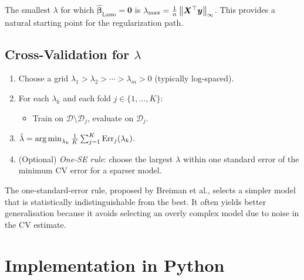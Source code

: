 \begin{proposition}
The smallest $\lambda$ for which $\hat{\bm{\beta}}_{\text{Lasso}} = \bm{0}$ is $\lambda_{\max} = \frac{1}{n}\left\| \bm{X}^\top\bm{y} \right\|_\infty$. This provides a natural starting point for the regularization path.
\end{proposition}

\subsection{Cross-Validation for $\lambda$}

\begin{algorithme}[title=\textbf{$K$-Fold CV for Regularization Strength}]
\begin{enumerate}
    \item Choose a grid $\lambda_1 > \lambda_2 > \cdots > \lambda_m > 0$ (typically log-spaced).
    \item For each $\lambda_k$ and each fold $j \in \{1,\ldots,K\}$:
        \begin{itemize}
            \item Train on $\mathcal{D} \setminus \mathcal{D}_j$, evaluate on $\mathcal{D}_j$.
        \end{itemize}
    \item $\hat{\lambda} = \operatorname*{arg\,min}_{\lambda_k} \frac{1}{K}\sum_{j=1}^{K}\text{Err}_j(\lambda_k)$.
    \item (Optional) \emph{One-SE rule}: choose the largest $\lambda$ within one standard error of the minimum CV error for a sparser model.
\end{enumerate}
\end{algorithme}

\begin{remark}
The one-standard-error rule, proposed by Breiman et al., selects a simpler model that is statistically indistinguishable from the best. It often yields better generalisation because it avoids selecting an overly complex model due to noise in the CV estimate.
\end{remark}

\section{Implementation in Python}

